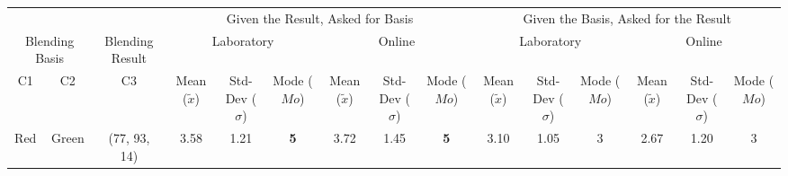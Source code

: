 \begin{table}[htbp]
  \resizebox{\textwidth}{!} {
  \begin{tabular}{@{}ccclcccccccccccc@{}}
    \toprule
    \multicolumn{2}{c}{}                                                     & \multicolumn{2}{c}{}                                       & \multicolumn{6}{c}{Given the Result, Asked for Basis}                                                                                                                                                                               & \multicolumn{6}{c}{Given the Basis, Asked for the Result}                                                                                                                                                                                                                                                                   \\ \cmidrule(l){5-16}
    \multicolumn{2}{c}{\multirow{-2}{*}{Blending Basis}}                     & \multicolumn{2}{c}{\multirow{-2}{*}{Blending Result}}      & \multicolumn{3}{c}{Laboratory}                                                                                   & \multicolumn{3}{c}{Online}                                                                                       & \multicolumn{3}{c}{Laboratory}                                                                                                                      & \multicolumn{3}{c}{Online}                                                                                                                                            \\ \midrule
    C1                      & C2                                             & \multicolumn{2}{c|}{C3}                                    & Mean ($\tilde{x}$)        & Std-Dev ($\sigma$)         & Mode ($Mo$)                                             & Mean ($\tilde{x}$)        & Std-Dev ($\sigma$)         & \multicolumn{1}{c|}{Mode ($Mo$)}                        & Mean ($\tilde{x}$)                          & Std-Dev ($\sigma$)                          & Mode ($Mo$)                                             & Mean ($\tilde{x}$)                          & Std-Dev ($\sigma$)                          & \multicolumn{1}{c|}{Mode ($Mo$)}                                          \\ \midrule
    Red                     & \multicolumn{1}{c|}{Green}                     & \multicolumn{2}{c|}{\cellcolor[HTML]{FFFF00}(77, 93, 14)}  & \multicolumn{1}{c|}{3.58} & \multicolumn{1}{c|}{1.21}  & \multicolumn{1}{c|}{\cellcolor[HTML]{32CB00}\textbf{5}} & \multicolumn{1}{c|}{3.72} & \multicolumn{1}{c|}{1.45}  & \multicolumn{1}{c|}{\cellcolor[HTML]{32CB00}\textbf{5}} & \multicolumn{1}{c|}{3.10}                   & \multicolumn{1}{c|}{1.05}                   & \multicolumn{1}{c|}{3}                                  & \multicolumn{1}{c|}{2.67}                   & \multicolumn{1}{c|}{1.20}                   & \multicolumn{1}{c|}{3}                                                    \\ \midrule

\end{tabular}}
\end{table}

